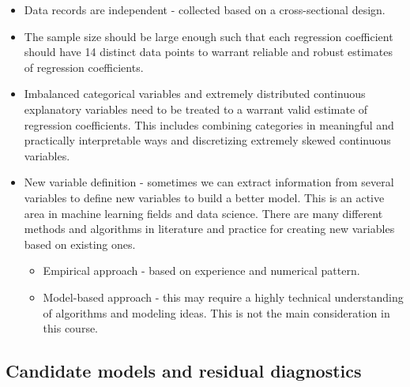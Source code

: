 \documentclass[
]{book}
\providecommand{\tightlist}{%
  \setlength{\itemsep}{0pt}\setlength{\parskip}{0pt}}
\begin{document}
\begin{itemize}
\item
  Data records are independent - collected based on a cross-sectional design.
\item
  The sample size should be large enough such that each regression coefficient should have 14 distinct data points to warrant reliable and robust estimates of regression coefficients.
\item
  Imbalanced categorical variables and extremely distributed continuous explanatory variables need to be treated to a warrant valid estimate of regression coefficients. This includes combining categories in meaningful and practically interpretable ways and discretizing extremely skewed continuous variables.
\item
  New variable definition - sometimes we can extract information from several variables to define new variables to build a better model. This is an active area in machine learning fields and data science. There are many different methods and algorithms in literature and practice for creating new variables based on existing ones.

  \begin{itemize}
  \tightlist
  \item
    Empirical approach - based on experience and numerical pattern.
  \item
    Model-based approach - this may require a highly technical understanding of algorithms and modeling ideas. This is not the main consideration in this course.
  \end{itemize}
\end{itemize}

\hypertarget{candidate-models-and-residual-diagnostics}{%
\subsection{Candidate models and residual diagnostics}\label{candidate-models-and-residual-diagnostics}}
\end{document}
